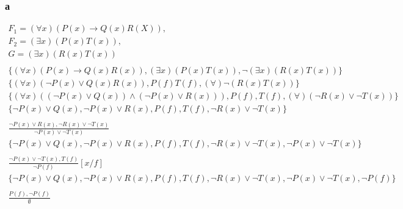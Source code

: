 \documentclass[12pt]{article}
\begin{document}
\subsubsection{а}
\begin{gather*}
  F_1 = \left(\forall x\right)\left(P(x)\rightarrow Q(x)R(X)\right), \\
  F_2 = \left(\exists x\right)\left(P(x)T(x)\right), \\
  G = \left(\exists x\right)\left(R(x)T(x)\right) \\
  \\
  \{\left(\forall x\right)\left(P(x)\rightarrow Q(x)R(x)\right), \left(\exists x\right)\left(P(x)T(x)\right), \neg\left(\exists x\right)\left(R(x)T(x)\right)\} \\
  \{\left(\forall x\right)\left(\neg P(x)\vee Q(x)R(x)\right), P(f)T(f), \left(\forall\right)\neg\left(R(x)T(x)\right)\} \\
  \{\left(\forall x\right)\left(\left(\neg P(x)\vee Q(x)\right)\wedge\left(\neg P(x) \vee R(x)\right)\right), P(f), T(f), \left(\forall\right)\left(\neg R(x)\vee \neg T(x)\right)\} \\
  \{\neg P(x)\vee Q(x), \neg P(x) \vee R(x), P(f), T(f), \neg R(x)\vee \neg T(x)\} \\
  \\
  \frac{\neg P(x) \vee R(x), \neg R(x) \vee \neg T(x)}{\neg P(x) \vee \neg T(x)} \\
  \{\neg P(x)\vee Q(x), \neg P(x) \vee R(x), P(f), T(f), \neg R(x)\vee \neg T(x), \neg P(x) \vee \neg T(x)\} \\
  \\
  \frac{\neg P(x) \vee \neg T(x), T(f)}{\neg P(f)}\left[x/f\right] \\
  \{\neg P(x)\vee Q(x), \neg P(x) \vee R(x), P(f), T(f), \neg R(x)\vee \neg T(x), \neg P(x) \vee \neg T(x), \neg P(f)\} \\
  \\
  \frac{P(f), \neg P(f)}{\emptyset} \\
\end{gather*}
\end{document}
